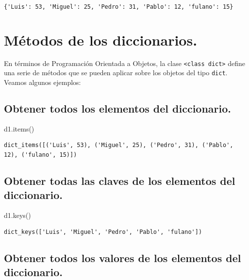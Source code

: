 \documentclass[
  spanish,
  letterpaper,
]{scrbook}
\newenvironment{Shaded}{\begin{snugshade}}{\end{snugshade}}
\newcommand{\NormalTok}[1]{\textcolor[rgb]{0.00,0.23,0.31}{#1}}
\theoremstyle{definition}
\theoremstyle{remark}
\begin{document}
\begin{verbatim}
{'Luis': 53, 'Miguel': 25, 'Pedro': 31, 'Pablo': 12, 'fulano': 15}
\end{verbatim}

\section{Métodos de los
diccionarios.}\label{muxe9todos-de-los-diccionarios.}

En términos de Programación Orientada a Objetos, la clase
\texttt{\textless{}class\ \textquotesingle{}dict\textquotesingle{}\textgreater{}}
define una serie de métodos que se pueden aplicar sobre los objetos del
tipo \texttt{dict}. Veamos algunos ejemplos:

\subsection{Obtener todos los elementos del
diccionario.}\label{obtener-todos-los-elementos-del-diccionario.}

\begin{Shaded}
\begin{Highlighting}[]
\NormalTok{d1.items() }
\end{Highlighting}
\end{Shaded}

\begin{verbatim}
dict_items([('Luis', 53), ('Miguel', 25), ('Pedro', 31), ('Pablo', 12), ('fulano', 15)])
\end{verbatim}

\subsection{Obtener todas las claves de los elementos del
diccionario.}\label{obtener-todas-las-claves-de-los-elementos-del-diccionario.}

\begin{Shaded}
\begin{Highlighting}[]
\NormalTok{d1.keys() }
\end{Highlighting}
\end{Shaded}

\begin{verbatim}
dict_keys(['Luis', 'Miguel', 'Pedro', 'Pablo', 'fulano'])
\end{verbatim}

\subsection{Obtener todos los valores de los elementos del
diccionario.}\label{obtener-todos-los-valores-de-los-elementos-del-diccionario.}
\end{document}
